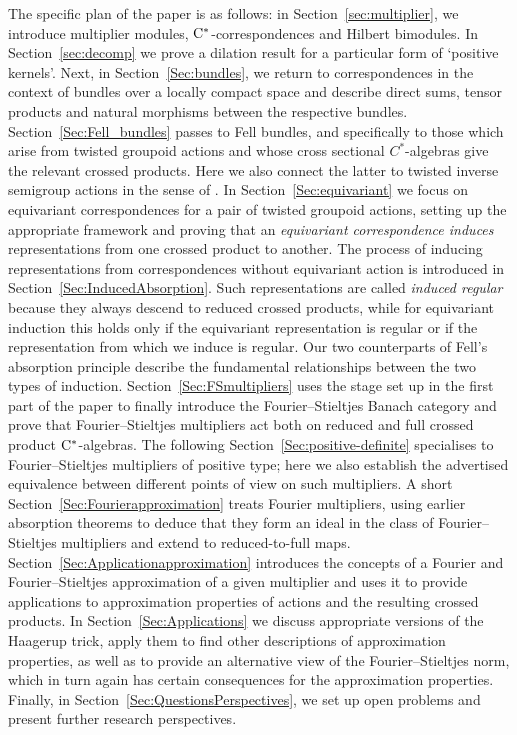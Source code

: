 \documentclass[11 pt, leqno]{amsart}
\numberwithin{equation}{section}
\theoremstyle{plain}
\theoremstyle{definition}
\newcommand{\cst}{\ifmmode\mathrm{C}^*\else{$\mathrm{C}^*$}\fi}
\begin{document}
The specific plan of the paper is as follows: in Section~\ref{sec:multiplier}, we introduce multiplier modules, $\cst$-correspondences and Hilbert bimodules. 
In Section~\ref{sec:decomp} we prove a dilation result for a particular form of `positive kernels'. 
Next, in Section~\ref{Sec:bundles}, we return to correspondences in the context of bundles over a locally compact space and describe direct sums, tensor products and natural morphisms between the respective bundles. 
Section~\ref{Sec:Fell_bundles} passes to Fell bundles, and specifically to those which arise from twisted groupoid actions and whose cross sectional $C^*$-algebras give the relevant crossed products. 
Here we also connect the latter to twisted inverse semigroup actions in the sense of \cite{BussExel}. 
In Section~\ref{Sec:equivariant} we focus on equivariant correspondences for a pair of twisted groupoid actions, setting up the appropriate framework and proving that an \emph{equivariant correspondence induces} representations from one crossed product to another. 
The process of inducing representations from correspondences without equivariant action is introduced in Section~\ref{Sec:InducedAbsorption}. 
Such representations are called \emph{induced regular} because they always descend to reduced crossed products, while for equivariant induction this holds only if the equivariant representation is regular or if the representation from which we induce is  regular.
Our two counterparts of Fell's absorption principle describe the fundamental relationships between the two types of induction. 
Section~\ref{Sec:FSmultipliers} uses the stage set up in the first part of the paper to finally introduce the Fourier--Stieltjes Banach category and prove that Fourier--Stieltjes multipliers act both on reduced and full crossed product $\cst$-algebras. 
The following Section~\ref{Sec:positive-definite} specialises to Fourier--Stieltjes multipliers of positive type; here we also establish the advertised equivalence between different points of view on such multipliers. 
A short Section~\ref{Sec:Fourierapproximation} treats Fourier multipliers, using earlier absorption theorems to deduce that they form an ideal in the class of Fourier--Stieltjes multipliers and extend to reduced-to-full maps. 
Section~\ref{Sec:Applicationapproximation} introduces the concepts of a Fourier and Fourier--Stieltjes approximation of a given multiplier and uses it to provide applications to approximation properties of actions and the resulting crossed products. 
In Section~\ref{Sec:Applications} we discuss appropriate versions of the Haagerup trick, apply them to find other descriptions of approximation properties, as well as to provide an alternative view of the Fourier--Stieltjes norm, which in turn again has certain consequences for the approximation properties. 
Finally, in Section~\ref{Sec:QuestionsPerspectives}, we set up open problems and present further research perspectives.
\end{document}
